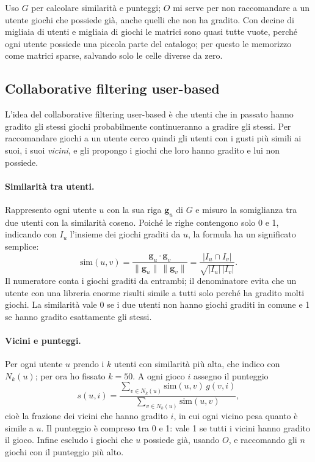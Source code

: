 \documentclass[11pt,a4paper]{article}
\begin{document}
Uso $G$ per calcolare similarità e punteggi; $O$ mi serve per non raccomandare a
un utente giochi che possiede già, anche quelli che non ha gradito. Con decine
di migliaia di utenti e migliaia di giochi le matrici sono quasi tutte vuote,
perché ogni utente possiede una piccola parte del catalogo; per questo le
memorizzo come matrici sparse, salvando solo le celle diverse da zero.

\subsection{Collaborative filtering user-based}

L'idea del collaborative filtering user-based è che utenti che in passato hanno
gradito gli stessi giochi probabilmente continueranno a gradire gli stessi. Per raccomandare giochi a un utente cerco quindi gli utenti con i
gusti più simili ai suoi, i suoi \emph{vicini}, e gli propongo i giochi che loro
hanno gradito e lui non possiede.

\paragraph{Similarità tra utenti.} Rappresento ogni utente $u$ con la sua riga
$\mathbf{g}_u$ di $G$ e misuro la somiglianza tra due utenti con la similarità
coseno. Poiché le righe contengono solo 0 e 1, indicando con $I_u$ l'insieme dei
giochi graditi da $u$, la formula ha un significato semplice:
\[
\mathrm{sim}(u,v) = \frac{\mathbf{g}_u \cdot \mathbf{g}_v}
{\lVert\mathbf{g}_u\rVert\,\lVert\mathbf{g}_v\rVert}
= \frac{|I_u \cap I_v|}{\sqrt{|I_u|\,|I_v|}}.
\]
Il numeratore conta i giochi graditi da entrambi; il denominatore evita che un
utente con una libreria enorme risulti simile a tutti solo perché ha gradito
molti giochi. La similarità vale 0 se i due utenti non hanno giochi graditi in
comune e 1 se hanno gradito esattamente gli stessi.

\paragraph{Vicini e punteggi.} Per ogni utente $u$ prendo i $k$ utenti con
similarità più alta, che indico con $N_k(u)$; per ora ho fissato $k = 50$. A
ogni gioco $i$ assegno il punteggio
\[
s(u,i) = \frac{\sum_{v \in N_k(u)} \mathrm{sim}(u,v)\, g(v,i)}
{\sum_{v \in N_k(u)} \mathrm{sim}(u,v)},
\]
cioè la frazione dei vicini che hanno gradito $i$, in cui ogni vicino pesa
quanto è simile a $u$. Il punteggio è compreso tra 0 e 1: vale 1 se tutti i
vicini hanno gradito il gioco. Infine escludo i giochi che $u$ possiede già,
usando $O$, e raccomando gli $n$ giochi con il punteggio più alto.
\end{document}
